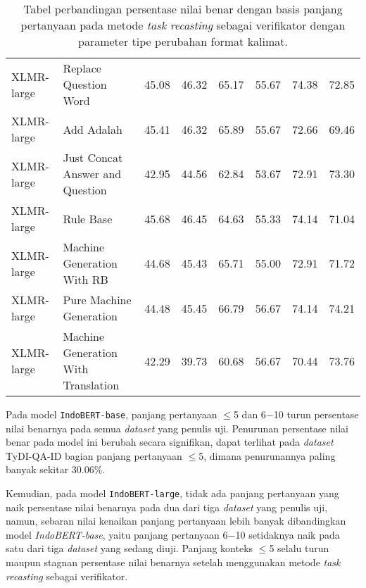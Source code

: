 \begin{table}[H]
\begin{tabular}{llrrrrrr}
    XLMR-large &               Replace Question Word &                   45.08 &                    46.32 &                   65.17 &                    55.67 &                   74.38 &                    72.85 \\
    XLMR-large &                          Add Adalah &                   45.41 &                    46.32 &                   65.89 &                    55.67 &                   72.66 &                    69.46 \\
    XLMR-large &     Just Concat Answer and Question &                   42.95 &                    44.56 &                   62.84 &                    53.67 &                   72.91 &                    73.30 \\
    XLMR-large &                           Rule Base &                   45.68 &                    46.45 &                   64.63 &                    55.33 &                   74.14 &                    71.04 \\
    XLMR-large &          Machine Generation With RB &                   44.68 &                    45.43 &                   65.71 &                    55.00 &                   72.91 &                    71.72 \\
    XLMR-large &             Pure Machine Generation &                   44.48 &                    45.45 &                   66.79 &                    56.67 &                   74.14 &                    74.21 \\
    XLMR-large & Machine Generation With Translation &                   42.29 &                    39.73 &                   60.68 &                    56.67 &                   70.44 &                    73.76 \\
\bottomrule
\end{tabular}
\caption{Tabel perbandingan persentase nilai benar dengan basis panjang pertanyaan pada metode \emph{task recasting} sebagai verifikator dengan parameter tipe perubahan format kalimat.}
\end{table}

Pada model \texttt{IndoBERT-base}, panjang pertanyaan $\leq$5 dan 6$-$10 turun persentase nilai benarnya pada semua \emph{dataset} yang penulis uji. Penurunan persentase nilai benar pada model ini berubah secara signifikan, dapat terlihat pada \emph{dataset} TyDI-QA-ID bagian panjang pertanyaan $\leq$5, dimana penurunannya paling banyak sekitar 30.06\%.

Kemudian, pada model \texttt{IndoBERT-large}, tidak ada panjang pertanyaan yang naik persentase nilai benarnya pada dua dari tiga \emph{dataset} yang penulis uji, namun, sebaran nilai kenaikan panjang pertanyaan lebih banyak dibandingkan model \emph{IndoBERT-base}, yaitu panjang pertanyaan 6$-$10 setidaknya naik pada satu dari tiga \emph{dataset} yang sedang diuji. Panjang konteks  $\leq$5 selalu turun maupun stagnan persentase nilai benarnya setelah menggunakan metode \emph{task recasting} sebagai verifikator.

